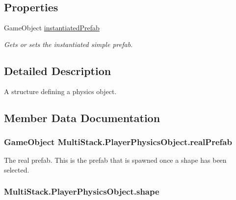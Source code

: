 \subsection*{Properties}
\begin{DoxyCompactItemize}
\item 
Game\+Object \hyperlink{struct_multi_stack_1_1_player_physics_object_ac4a840e0e27b4696fbbf7fbb105bd528}{instantiated\+Prefab}
\begin{DoxyCompactList}\small\item\em Gets or sets the instantiated simple prefab. \end{DoxyCompactList}\end{DoxyCompactItemize}


\subsection{Detailed Description}
A structure defining a physics object. 



\subsection{Member Data Documentation}
\hypertarget{struct_multi_stack_1_1_player_physics_object_a12ec933050599f2b98759c1c4ceee830}{}
\subsubsection[{real\+Prefab}]{\setlength{\rightskip}{0pt plus 5cm}Game\+Object Multi\+Stack.\+Player\+Physics\+Object.\+real\+Prefab}\label{struct_multi_stack_1_1_player_physics_object_a12ec933050599f2b98759c1c4ceee830}


The real prefab. This is the prefab that is spawned once a shape has been selected. 

\hypertarget{struct_multi_stack_1_1_player_physics_object_a7232e0e0dce8cd41a4d60977c4c6bc7b}{}
\subsubsection[{shape}]{ Multi\+Stack.\+Player\+Physics\+Object.\+shape}\label{struct_multi_stack_1_1_player_physics_object_a7232e0e0dce8cd41a4d60977c4c6bc7b}



